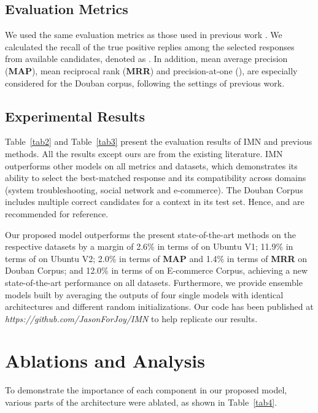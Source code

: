 \documentclass[sigconf]{acmart}
\begin{document}
  \subsection{Evaluation Metrics}
    We used the same evaluation metrics as those used in previous work \cite{DBLP:conf/sigdial/LowePSP15,DBLP:conf/acl/WuWXZL17,DBLP:conf/coling/ZhangLZZL18}. We calculated the recall of the true positive replies among the  selected responses from  available candidates, denoted as . In addition, mean average precision (\textbf{MAP}), mean reciprocal rank (\textbf{MRR}) and precision-at-one (), are especially considered for the Douban corpus, following the settings of previous work.


  \subsection{Experimental Results}

    Table~\ref{tab2} and Table~\ref{tab3} present the evaluation results of IMN and previous methods. All the results except ours are from the existing literature. IMN  outperforms other models on all metrics and datasets, which demonstrates its ability to select the best-matched response and its compatibility across domains (system troubleshooting, social network and e-commerce). The Douban Corpus includes multiple correct candidates for a context in its test set. Hence,  and  are recommended for reference.

Our proposed model outperforms the present state-of-the-art methods on the respective datasets by a margin of 2.6\% in terms of  on Ubuntu V1; 11.9\% in terms of  on Ubuntu V2; 2.0\% in terms of \textbf{MAP} and 1.4\% in terms of \textbf{MRR} on Douban Corpus; and 12.0\% in terms of  on E-commerce Corpus, achieving a new state-of-the-art performance on all datasets. Furthermore, we provide ensemble models built by averaging the outputs of four single models with identical architectures and different random initializations.
    Our code has been published at \emph{https://github.com/JasonForJoy/IMN} to help replicate our results. 


\section{Ablations and Analysis}

    To demonstrate the importance of each component in our proposed model, various parts of the architecture were ablated, as shown in Table~\ref{tab4}.
\end{document}
